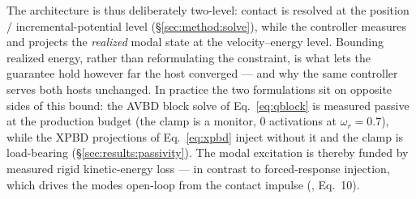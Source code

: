The architecture is thus deliberately two-level: contact is resolved at the
position / incremental-potential level (\S\ref{sec:method:solve}), while the
controller measures and projects the \emph{realized} modal state at the
velocity--energy level. Bounding realized energy, rather than reformulating
the constraint, is what lets the guarantee hold however far the host
converged --- and why the same controller serves both hosts unchanged.
In practice the two formulations sit on opposite sides of this bound: the AVBD
block solve of Eq.~\ref{eq:qblock} is measured passive at the production
budget (the clamp is a monitor, $0$ activations at $\omega_r=0.7$), while the
XPBD projections of Eq.~\ref{eq:xpbd} inject without it and the clamp is
load-bearing (\S\ref{sec:results:passivity}).
The modal
excitation is thereby funded by measured rigid kinetic-energy loss --- in
contrast to forced-response injection, which drives the modes open-loop
from the contact impulse (\citealp{coevoet2020distant}, Eq.~10).
